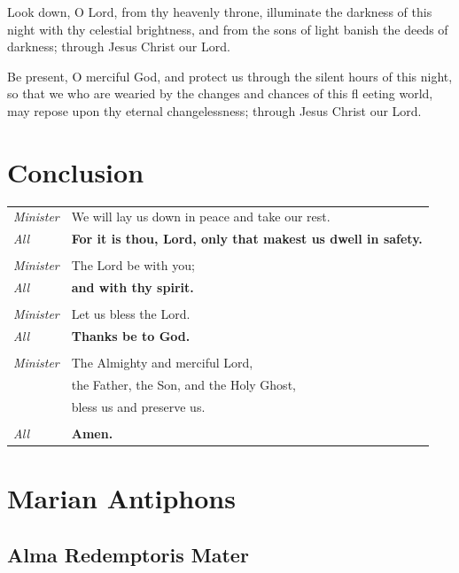 \documentclass[10pt]{article}
\begin{document}
Look down, O Lord, from thy heavenly throne,
illuminate the darkness of this night with thy celestial brightness,
and from the sons of light banish the deeds of darkness;
through Jesus Christ our Lord.


Be present, O merciful God,
and protect us through the silent hours of this night,
so that we who are wearied
by the changes and chances of this fl eeting world,
may repose upon thy eternal changelessness;
through Jesus Christ our Lord.

\section*{Conclusion}

\begin{tabularx}{\linewidth}{lX}
 
    \textit{Minister} & We will lay us down in peace and take our rest. \\
    \textit{All} & \textbf{For it is thou, Lord, only that makest us dwell in safety.} \\
    & \\
    \textit{Minister} & The Lord be with you; \\
    \textit{All} & \textbf{and with thy spirit.} \\
    & \\
    \textit{Minister} & Let us bless the Lord. \\
    \textit{All} & \textbf{Thanks be to God.} \\
    & \\
    \textit{Minister} & The Almighty and merciful Lord, \\
    & the Father, the Son, and the Holy Ghost, \\
    & bless us and preserve us. \\
    & \\
    \textit{All} & \textbf{Amen.}
 
\end{tabularx}

\section*{Marian Antiphons}

\subsection*{Alma Redemptoris Mater}
\end{document}
